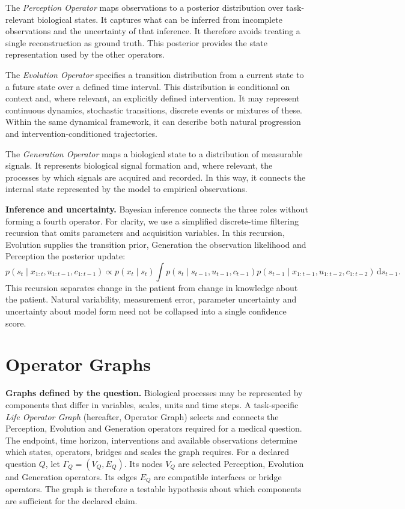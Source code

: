 \documentclass[12pt, letterpaper]{article} %
\begin{document}
The \emph{Perception Operator} maps observations to a posterior distribution over task-relevant biological states. It captures what can be inferred from incomplete observations and the uncertainty of that inference. It therefore avoids treating a single reconstruction as ground truth. This posterior provides the state representation used by the other operators.

The \emph{Evolution Operator} specifies a transition distribution from a current state to a future state over a defined time interval. This distribution is conditional on context and, where relevant, an explicitly defined intervention. It may represent continuous dynamics, stochastic transitions, discrete events or mixtures of these. Within the same dynamical framework, it can describe both natural progression and intervention-conditioned trajectories.

The \emph{Generation Operator} maps a biological state to a distribution of measurable signals. It represents biological signal formation and, where relevant, the processes by which signals are acquired and recorded. In this way, it connects the internal state represented by the model to empirical observations.

\textbf{Inference and uncertainty.} Bayesian inference connects the three roles without forming a fourth operator. For clarity, we use a simplified discrete-time filtering recursion that omits parameters and acquisition variables. In this recursion, Evolution supplies the transition prior, Generation the observation likelihood and Perception the posterior update:
\begin{equation}
 p(s_t\mid x_{1:t},u_{1:t-1},c_{1:t-1}) \propto p(x_t\mid s_t)
 \int p(s_t\mid s_{t-1},u_{t-1},c_{t-1})
 p(s_{t-1}\mid x_{1:t-1},u_{1:t-2},c_{1:t-2})\,\mathrm d s_{t-1}.
 \label{eq:bayes}
\end{equation}
This recursion separates change in the patient from change in knowledge about the patient. Natural variability, measurement error, parameter uncertainty and uncertainty about model form need not be collapsed into a single confidence score.

\section{Operator Graphs}

\textbf{Graphs defined by the question.} Biological processes may be represented by components that differ in variables, scales, units and time steps. A task-specific \emph{Life Operator Graph} (hereafter, Operator Graph) selects and connects the Perception, Evolution and Generation operators required for a medical question. The endpoint, time horizon, interventions and available observations determine which states, operators, bridges and scales the graph requires. For a declared question $Q$, let $\Gamma_Q=(V_Q,E_Q)$. Its nodes $V_Q$ are selected Perception, Evolution and Generation operators. Its edges $E_Q$ are compatible interfaces or bridge operators. The graph is therefore a testable hypothesis about which components are sufficient for the declared claim.
\end{document}
